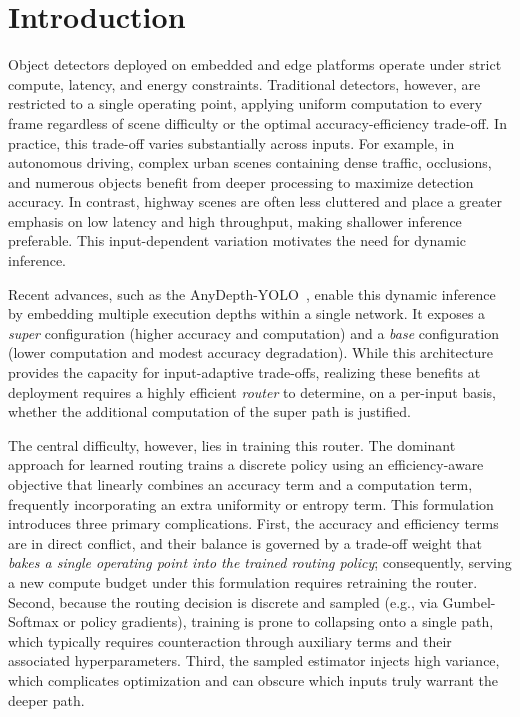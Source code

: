 \section{Introduction}
\label{sec:intro}

Object detectors deployed on embedded and edge platforms operate under strict compute, latency, and energy constraints. Traditional detectors, however, are restricted to a single operating point, applying uniform computation to every frame regardless of scene difficulty or the optimal accuracy-efficiency trade-off. In practice, this trade-off varies substantially across inputs. For example, in autonomous driving, complex urban scenes containing dense traffic, occlusions, and numerous objects benefit from deeper processing to maximize detection accuracy. In contrast, highway scenes are often less cluttered and place a greater emphasis on low latency and high throughput, making shallower inference preferable. This input-dependent variation motivates the need for dynamic inference.


Recent advances, such as the AnyDepth-YOLO~\cite{kang2026anydepth}, enable this dynamic inference by embedding multiple execution depths within a single network. 
It exposes a \emph{super} configuration (higher accuracy and computation) and a \emph{base} configuration (lower computation and modest accuracy degradation). 
While this architecture provides the capacity for input-adaptive trade-offs, realizing these benefits at deployment requires a highly efficient \emph{router} to determine, on a per-input basis, whether the additional computation of the super path is justified.


The central difficulty, however, lies in training this router. 
The dominant approach for learned routing trains a discrete policy using an efficiency-aware objective that linearly combines an accuracy term and a computation term, frequently incorporating an extra uniformity or entropy term. 
This formulation introduces three primary complications. 
First, the accuracy and efficiency terms are in direct conflict, and their balance is governed by a trade-off weight that \emph{bakes a single operating point into the trained routing policy}; consequently, serving a new compute budget under this formulation requires retraining the router. 
Second, because the routing decision is discrete and sampled (e.g., via Gumbel-Softmax or policy gradients), training is prone to collapsing onto a single path, which typically requires counteraction through auxiliary terms and their associated hyperparameters. 
Third, the sampled estimator injects high variance, which complicates optimization and can obscure which inputs truly warrant the deeper path.


